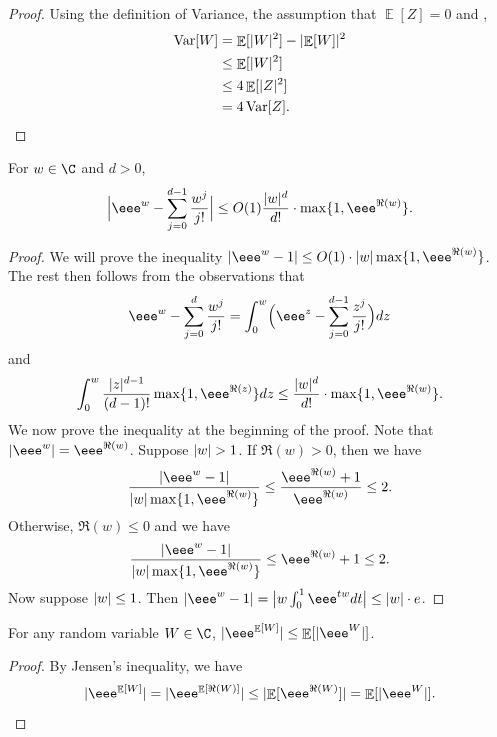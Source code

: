 \documentclass{toc}
\DeclarePairedDelimiter{\abs}{\lvert}{\rvert}
\DeclareMathOperator*{\E}{\mathbb{E}}                 %
\DeclareMathOperator*{\Var}{Var}                 %
\begin{document}
  \begin{proof}
    Using the definition of Variance, the assumption that $\E[Z] = 0$ and ,
    \begin{align*}
      \Var[W]
      &= \E[\abs{W}^2] - \abs{\E[W]}^2 \\
      &\le \E[\abs{W}^2] \\
      &\le 4 \E[\abs{Z}^2] \\
      &= 4 \Var[Z]. \qedhere
    \end{align*}
  \end{proof}

  \begin{lemma} \label{lemma-taylor}
    For $w \in \C$ and $d > 0$,
      \[
        \Bigl| \eee^w - \sum_{j = 0}^{d-1} \frac{w^j}{j!} \Bigr| \le O(1) \frac{ \abs{w}^d }{ d! } \cdot \max\{ 1, \eee^{\Re(w)} \}.
      \]
  \end{lemma}
  \begin{proof}
    We will prove the inequality $\abs{\eee^w - 1} \le O(1) \cdot \abs{w} \max\{1, \eee^{\Re(w)}\}$.
    The rest then follows from the observations that
    \[
      \eee^w - \sum_{j=0}^d \frac{w^j}{j!} = \int_0^w \Bigl( \eee^z - \sum_{j=0}^{d-1} \frac{z^j}{j!} \Bigr) dz 
    \]
    and
    \[
      \int_0^w \frac{\abs{z}^{d-1}}{(d-1)!} \max\{1, \eee^{\Re(z)} \} dz \le \frac{\abs{w}^d}{d!} \cdot \max\{1, \eee^{\Re(w)}\} .
    \]
    We now prove the inequality at the beginning of the proof.
    Note that $\abs{\eee^w} = \eee^{\Re(w)}$.
    Suppose $\abs{w} > 1$.
    If $\Re(w) > 0$, then we have
    \[\frac{\abs{\eee^w - 1}}{\abs{w} \max\{1, \eee^{\Re(w)}\} } \le \frac{\eee^{\Re(w)} + 1}{\eee^{\Re(w)}} \le 2.
    \]
    Otherwise, $\Re(w) \le 0$ and we have
    \[
      \frac{\abs{\eee^w - 1}}{\abs{w} \max\{1, \eee^{\Re(w)}\} } \le \eee^{\Re(w)} + 1 \le 2.
      \]
    Now suppose $\abs{w} \le 1$.
    Then $\abs{\eee^w - 1} = \bigl| w \int_0^1 \eee^{tw} dt \bigr| \le \abs{w} \cdot e$.

  \end{proof}

  \begin{lemma} \label{lemma-jensen}
    For any random variable $W \in \C$, $\abs{ \eee^{\E[W]} } \le \E[\abs{ \eee^{W} }]$.
  \end{lemma}
  \begin{proof}
    By Jensen's inequality, we have
    \[
      \abs{ \eee^{\E[W]} } = \abs{ \eee^{\E[\Re(W)]} } \le \abs{ \E[\eee^{\Re(W)}] } = \E[\abs{\eee^W}] . \qedhere
    \]
  \end{proof}
\end{document}
